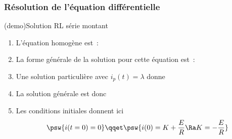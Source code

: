 \documentclass[../../main/main.tex]{subfiles}
\begin{document}
\subsubsection{Résolution de l'équation différentielle}
\begin{tcb}[label=demo:rlsolu](demo){Solution RL série montant}
	\begin{enumerate}[label=\sqenumi]
		\item L'équation homogène est~:
		      \psw{
			      \[
				      \dv{i_h}{t} + \frac{1}{\tau}i_h = 0
			      \]
		      }
		      \vspace{-15pt}
		\item La forme générale de la solution pour cette équation est~:
		      \psw{
			      \[
				      i_h(t) = K\exp\left( -\frac{t}{\tau} \right)
			      \]
		      }
		      \vspace{-15pt}
		\item Une solution particulière avec $i_p(t) = \lambda$ donne
		\item La solution générale est donc
		      \psw{
			      \[
				      i(t) = \frac{E}{R} + K\exp \left( - \frac{t}{\tau} \right)
			      \]
		      }
		      \vspace{-15pt}
		\item Les conditions initiales donnent ici
		      \[
			      \psw{i(t=0) = 0}
			      \qqet
			      \psw{i(0) = K + \frac{E}{R} \Ra K=-\frac{E}{R}}
		      \]
	\end{enumerate}
\end{tcb}
\end{document}
